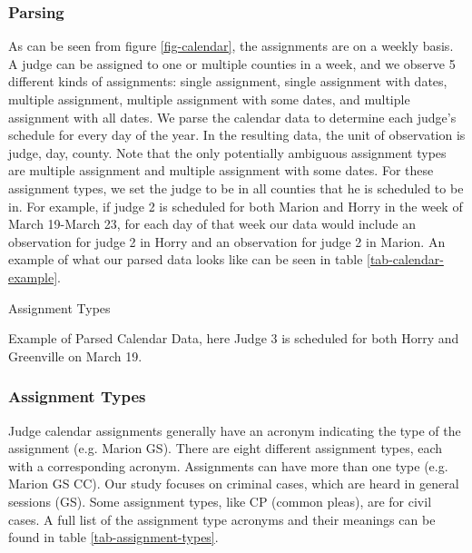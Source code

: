 \documentclass[11pt]{article}
\theoremstyle{ModifiedStyle}
\theoremstyle{ModifiedStyle}
\begin{document}
    \subsubsection{Parsing}
      As can be seen from figure \ref{fig-calendar}, the assignments are on a weekly basis. A judge can be assigned to one or multiple counties in a week, and we observe 5 different kinds of assignments: single assignment, single assignment with dates, multiple assignment, multiple assignment with some dates, and multiple assignment with all dates. We parse the calendar data to determine each judge's schedule for every day of the year. In the resulting data, the unit of observation is judge, day, county. Note that the only potentially ambiguous assignment types are multiple assignment and multiple assignment with some dates. For these assignment types, we set the judge to be in all counties that he is scheduled to be in. For example, if judge 2 is scheduled for both Marion and Horry in the week of March 19-March 23, for each day of that week our data would include an observation for judge 2 in Horry and an observation for judge 2 in Marion. An example of what our parsed data looks like can be seen in table \ref{tab-calendar-example}.

      \begin{table}[H]
        \centering
        \caption{Assignment Types}
        \label{tab-assignments}
        
      \end{table}

      \begin{table}[H]
        \centering
        \caption{Example of Parsed Calendar Data, here Judge 3 is scheduled for both Horry and Greenville on March 19.}
        \label{tab-calendar-example}
        
      \end{table}

    \subsubsection{Assignment Types}
      Judge calendar assignments generally have an acronym indicating the type of the assignment (e.g. Marion GS). There are eight different assignment types, each with a corresponding acronym. Assignments can have more than one type (e.g. Marion GS CC). Our study focuses on criminal cases, which are heard in general sessions (GS). Some assignment types, like CP (common pleas), are for civil cases. A full list of the assignment type acronyms and their meanings can be found in table \ref{tab-assignment-types}.
\end{document}
